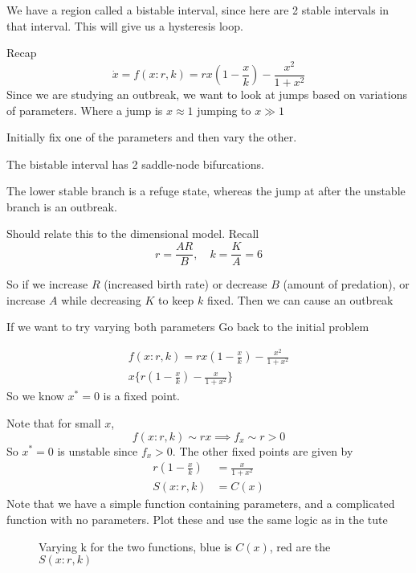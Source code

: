 \documentclass{/home/janmebows/Documents/LatexTemplates/myassignment}
\begin{document}
We have a region called a bistable interval, since here are 2 stable intervals in that interval. This will give us a hysteresis loop.




Recap
\[\dot x = f(x:r,k) = rx\left(1-\frac xk\right) - \frac{x^2}{1+x^2}\]
Since we are studying an outbreak, we want to look at jumps based on variations of parameters. Where a jump is $x\approx 1$ jumping to $x\gg 1$

Initially fix one of the parameters and then vary the other.

The bistable interval has 2 saddle-node bifurcations.


The lower stable branch is a refuge state, whereas the jump at after the unstable branch is an outbreak.

Should relate this to the dimensional model. Recall
\[r = \frac{AR}{B},\quad k=\frac KA = 6\]


So if we increase $R$ (increased birth rate) or decrease $B$ (amount of predation), or increase $A$ while decreasing $K$ to keep $k$ fixed. Then we can cause an outbreak


If we want to try varying both parameters
Go back to the initial problem

\begin{align*}
    f(x:r,k) = rx\left(1-\frac xk\right) - \frac{x^2}{1+x^2}\\
    x\{r\left(1-\frac xk\right) - \frac{x}{1+x^2}\}
\end{align*}
So we know $x^* =0 $ is a fixed point. 

Note that for small $x$,
\[f(x:r,k) \sim rx \implies f_x \sim r > 0\]
So $x^* = 0$ is unstable since $f_x > 0$.
The other fixed points are given by
\begin{align*}
    r\left(1-\frac xk\right) &= \frac{x}{1+x^2} \\
    S(x:r,k) &= C(x)
\end{align*}
Note that we have a simple function containing parameters, and a complicated function with no parameters. Plot these and use the same logic as in the tute


\begin{figure}[h]
\centering
{}
\caption{Varying k for the two functions, blue is $C(x)$, red are the $S(x:r,k)$}
\end{figure}
\end{document}
